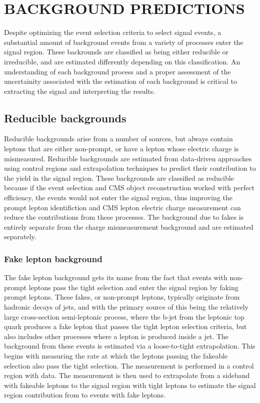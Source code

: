 %
%

\chapter{BACKGROUND PREDICTIONS}
Despite optimizing the event selection criteria to select signal events, a substantial amount of background events from a variety of processes enter the signal region.
These backrounds are classified as being either reducible or irreducible, and are estimated differently depending on this classification. An understanding
of each background process and a proper assessment of the uncertainity associated with the estimation of each background is critical to extracting the signal and interpreting
the results. 

\section{Reducible backgrounds}
Reducible backgrounds arise from a number of sources, but always contain leptons that are either non-prompt, or have a lepton whose electric charge is mismeasured.
Reducible backgrounds are estimated from data-driven approaches using control regions and extrapolation techniques to predict their contribution to the yield in the
signal region. 
These backgrounds are classified as reducible because if the event selection and CMS object reconstruction worked with perfect efficiency, the events would not
enter the signal region, thus improving the prompt lepton identifiction and CMS lepton electric charge measurement can reduce the contributions from these processes.
The background due to fakes is entirely separate from the charge mismeasurement background and are estimated separately. 

\subsection{Fake lepton background} 
The fake lepton background gets its name from the fact that events with non-prompt leptons pass the tight selection and enter the signal region by faking prompt leptons. These
fakes, or non-prompt leptons, typically originate from hadronic decays of jets, and with the primary source of this being the relatively large cross-section semi-leptonic \ttbar
process, where the b-jet from the leptonic top quark produces a fake lepton that passes the tight lepton selection criteria, but also includes other processes where a lepton
is produced inside a jet. The background from these events is estimated via a loose-to-tight extrapolation. This begins with measuring the rate at which the leptons passing
the fakeable selection also pass the tight selection. The measurement is performed in a control region with data.
The measurement is then used to extrapolate from a sideband with fakeable leptons to the signal region with
tight leptons to estimate the signal region contribution from to events with fake leptons. 


